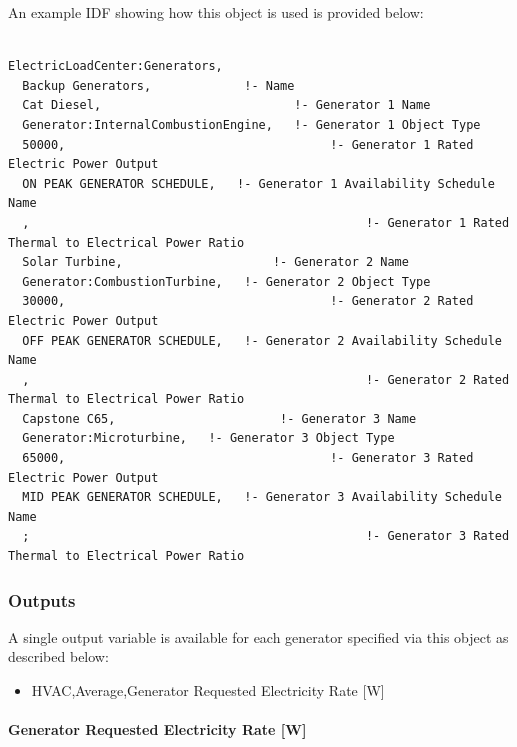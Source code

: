 An example IDF showing how this object is used is provided below:

\begin{lstlisting}

ElectricLoadCenter:Generators,
  Backup Generators,             !- Name
  Cat Diesel,                           !- Generator 1 Name
  Generator:InternalCombustionEngine,   !- Generator 1 Object Type
  50000,                                     !- Generator 1 Rated Electric Power Output
  ON PEAK GENERATOR SCHEDULE,   !- Generator 1 Availability Schedule Name
  ,                                               !- Generator 1 Rated Thermal to Electrical Power Ratio
  Solar Turbine,                     !- Generator 2 Name
  Generator:CombustionTurbine,   !- Generator 2 Object Type
  30000,                                     !- Generator 2 Rated Electric Power Output
  OFF PEAK GENERATOR SCHEDULE,   !- Generator 2 Availability Schedule Name
  ,                                               !- Generator 2 Rated Thermal to Electrical Power Ratio
  Capstone C65,                       !- Generator 3 Name
  Generator:Microturbine,   !- Generator 3 Object Type
  65000,                                     !- Generator 3 Rated Electric Power Output
  MID PEAK GENERATOR SCHEDULE,   !- Generator 3 Availability Schedule Name
  ;                                               !- Generator 3 Rated Thermal to Electrical Power Ratio
\end{lstlisting}

\subsubsection{Outputs}\label{outputs-2-007}

A single output variable is available for each generator specified via this object as described below:

\begin{itemize}
\tightlist
\item
  HVAC,Average,Generator Requested Electricity Rate {[}W{]}
\end{itemize}

\paragraph{Generator Requested Electricity Rate {[}W{]}}\label{generator-requested-electric-power-w}

